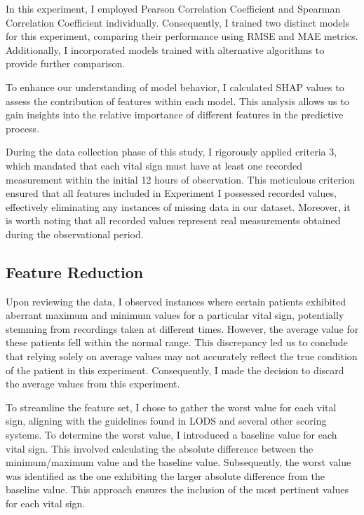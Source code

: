 \documentclass[12pt,a4paper,english
]{tunithesis}
\begin{document}
In this experiment, I employed Pearson Correlation Coefficient and Spearman Correlation Coefficient individually. Consequently, I trained two distinct models for this experiment, comparing their performance using RMSE and MAE metrics. Additionally, I incorporated models trained with alternative algorithms to provide further comparison.

To enhance our understanding of model behavior, I calculated SHAP values to assess the contribution of features within each model. This analysis allows us to gain insights into the relative importance of different features in the predictive process.

During the data collection phase of this study, I rigorously applied criteria 3, which mandated that each vital sign must have at least one recorded measurement within the initial 12 hours of observation. This meticulous criterion ensured that all features included in Experiment I possessed recorded values, effectively eliminating any instances of missing data in our dataset. Moreover, it is worth noting that all recorded values represent real measurements obtained during the observational period. 

\subsection{Feature Reduction}
Upon reviewing the data, I observed instances where certain patients exhibited aberrant maximum and minimum values for a particular vital sign, potentially stemming from recordings taken at different times. However, the average value for these patients fell within the normal range. This discrepancy led us to conclude that relying solely on average values may not accurately reflect the true condition of the patient in this experiment. Consequently, I made the decision to discard the average values from this experiment. 

To streamline the feature set, I chose to gather the worst value for each vital sign, aligning with the guidelines found in LODS and several other scoring systems. To determine the worst value, I introduced a baseline value for each vital sign. This involved calculating the absolute difference between the minimum/maximum value and the baseline value. Subsequently, the worst value was identified as the one exhibiting the larger absolute difference from the baseline value. This approach ensures the inclusion of the most pertinent values for each vital sign.
\end{document}
